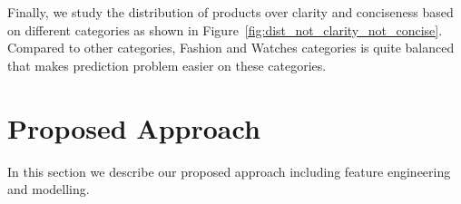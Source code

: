 \documentclass[sigconf]{acmart}
\begin{document}

Finally, we study the distribution of products over clarity and conciseness based on different categories as shown in Figure~\ref{fig:dist_not_clarity_not_concise}. Compared to other categories, Fashion and Watches categories is quite balanced that makes prediction problem easier on these categories.

\section{Proposed Approach}
In this section we describe our proposed approach including feature engineering and modelling.

\end{document}
